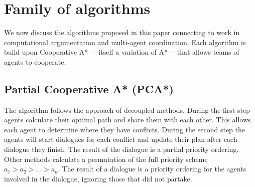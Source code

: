 \section{Family of algorithms}\label{sec:method}
We now discuss the algorithms proposed in this paper connecting to work in 
computational argumentation and multi-agent coordination. Each algorithm is 
build upon Cooperative A*~\cite{silver2005}---itself a variation of A* 
\cite{hart1968}---that allows teams of agents to cooperate.


\subsection{Partial Cooperative A* (PCA*)}
The algorithm follows the approach of decoupled methods. During the first step
agents calculate their optimal path and share them with each other. This allows
each agent to determine where they have conflicts. During the second step the
agents will start dialogues for each conflict and update their plan after each
dialogue they finish. The result of the dialogue is a partial priority
ordering. Other methods calculate a permutation of the full priority scheme
$a_1 > a_2 > \ldots > a_k$. The result of a dialogue is a priority ordering for
the agents involved in the dialogue, ignoring those that did not partake.

